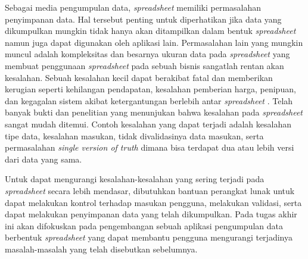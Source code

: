 Sebagai media pengumpulan data, \textit{spreadsheet} memiliki permasalahan penyimpanan data. Hal tersebut penting untuk diperhatikan jika data yang dikumpulkan mungkin tidak hanya akan ditampilkan dalam bentuk \textit{spreadsheet} namun juga dapat digunakan oleh aplikasi lain. Permasalahan lain yang mungkin muncul adalah kompleksitas dan besarnya ukuran data pada \textit{spreadsheet} yang membuat penggunaan \textit{spreadsheet} pada sebuah bisnis sangatlah rentan akan kesalahan. Sebuah kesalahan kecil dapat berakibat fatal dan memberikan kerugian seperti kehilangan pendapatan, kesalahan pemberian harga, penipuan, dan kegagalan sistem akibat ketergantungan berlebih antar \textit{spreadsheet} \citep{EUSPRIGAbout}. Telah banyak bukti dan penelitian yang menunjukan bahwa kesalahan pada \textit{spreadsheet} sangat mudah ditemui. %
Contoh kesalahan yang dapat terjadi adalah kesalahan tipe data, kesalahan masukan, tidak divalidasinya data masukan, serta permasalahan \textit{single version of truth} dimana bisa terdapat dua atau lebih versi dari data yang sama.


Untuk dapat mengurangi kesalahan-kesalahan yang sering terjadi pada \textit{spreadsheet} secara lebih mendasar, dibutuhkan bantuan perangkat lunak untuk dapat melakukan kontrol terhadap masukan pengguna, melakukan validasi, serta dapat melakukan penyimpanan data yang telah dikumpulkan. Pada tugas akhir ini akan difokuskan pada pengembangan sebuah aplikasi pengumpulan data berbentuk \textit{spreadsheet} yang dapat membantu pengguna mengurangi terjadinya masalah-masalah yang telah disebutkan sebelumnya.

